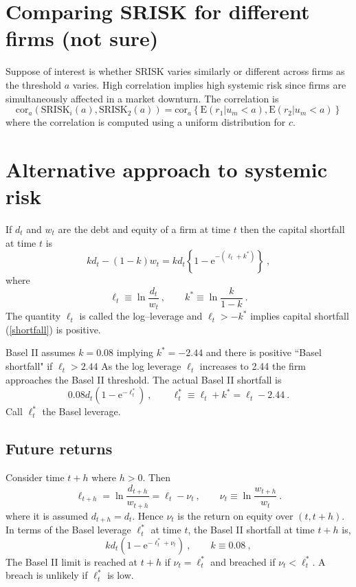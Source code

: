 \documentclass[authoryear]{elsarticle}
\newcommand{\E}{\mathrm{E}}
\newcommand{\e}{\mathrm{e}}
\newcommand{\cor}{\mathrm{cor}}
\newcommand{\eref}[1]{(\ref{#1})}
\newcommand{\cq}{\ , \qquad}
\newcommand{\be}[1]{\begin{equation}\label{#1}}
\newcommand{\ee}{\end{equation}}
\begin{document}
\section{Comparing SRISK for different firms (not sure)}

Suppose of interest is whether SRISK varies similarly or different across firms as the threshold $a$ varies. High correlation implies high systemic risk since firms are simultaneously affected in a market downturn. The correlation is
$$
\cor_a\left( \mathrm{SRISK}_i(a), \mathrm{SRISK}_2(a)\right) = \cor_a \left\{\E(r_1|u_m < a),\E(r_2|u_m < a)   \right\}
$$
where the correlation is computed using a uniform distribution for $c$. 


\section{Alternative approach to systemic risk}

If $d_t$ and $w_t$ are the debt and equity of a firm at time $t$ then the capital shortfall at time $t$ is 
\be{shortfall}
kd_t  - (1-k) w_t = kd_t\left\{1-\e^{-(\ell_t+k^*)}\right\}\ ,
\ee
where 
$$
\ell_t \equiv \ln\frac{d_t}{w_t} \cq k^*\equiv\ln \frac{k}{1-k}\ .
$$
The quantity $\ell_t$ is called the log--leverage and $\ell_t>-k^*$ implies capital shortfall \eref{shortfall} is positive. 

Basel II assumes $k=0.08$ implying $k^*=-2.44$  and there is  positive  ``Basel shortfall"  if
$\ell_t > 2.44$
As the log leverage $\ell_t$  increases to 2.44 the firm approaches the Basel II threshold. 
The actual Basel II shortfall is
$$
 0.08d_t(1-\e^{-\ell^*_t})\cq \ell_t^*\equiv\ell_t+k^*=\ell_t-2.44 \ .
$$
Call $\ell_t^*$ the Basel leverage.

\subsection{Future returns}

Consider  time  $t+h$ where $h>0$.  Then
$$
\ell_{t+h} = \ln \frac{d_{t+h}}{w_{t+h}} = \ell_t -\nu_{t}\cq \nu_t\equiv \ln\frac{w_{t+h}}{w_t}  \ .
$$
where it is assumed $d_{t+h}=d_t$.  Hence $\nu_{t}$ is the return on equity over $(t,t+h)$. 
In terms of the Basel leverage $\ell_t^*$ at time $t$, the  Basel II shortfall  at time $t+h$ is,
\be{bs}
kd_t(1-\e^{-\ell^*_t+\nu_{t}})\cq k\equiv 0.08\ , 
\ee 
The Basel II limit is reached at $t+h$ if $\nu_{t}=\ell_t^*$ and  breached  if
$
\nu_{t}< \ell_t^*
$.
A breach is  unlikely if $\ell^*_t$ is low.
\end{document}
